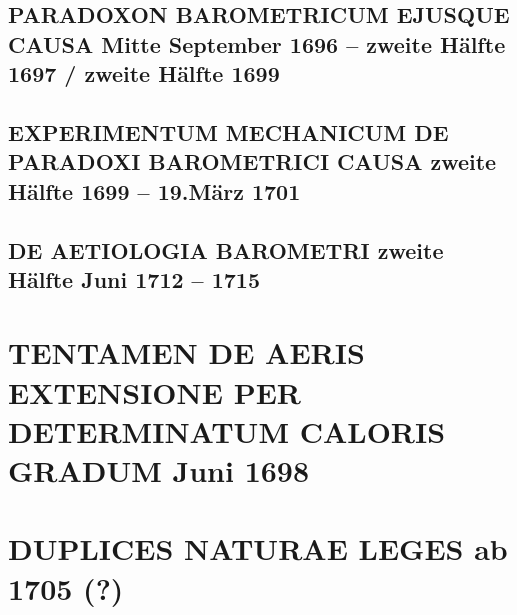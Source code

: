 \documentclass[%
fontsize=10pt,
]{scrbook}
\DeclareRobustCommand{\bracks}[1]{%
\textup{\lbrack}#1\textup{\rbrack}}
\begin{document}
\section[tocentry={Paradoxon barometricum ejusque causa
\enskip%
\bracks{%
Mitte September 1696 -- zweite Hälfte 1697 / zweite Hälfte 1699%
}%
},
head={Paradoxon barometricum ejusque causa}]%
{\MakeUppercase{Paradoxon barometricum ejusque causa}
\newline%
\bracks{%
Mitte September 1696 -- zweite Hälfte 1697 / zweite Hälfte 1699%
}}
\label{60267}



\section[tocentry={Experimentum mechanicum de paradoxi barometrici causa %
\enskip \bracks{zweite Hälfte 1699 -- 19.\;März 1701}%
},
head={Experimentum mechanicum de paradoxi barometrici causa}]%
{\MakeUppercase{Experimentum mechanicum de paradoxi barometrici causa} %
\newline \bracks{zweite Hälfte 1699 -- 19.\;März 1701}%
}
\label{36805}



\section[tocentry={De aetiologia barometri
\enskip%
\bracks{zweite Hälfte Juni 1712 --
1715%
}},
head={De aetiologia barometri}]%
{\MakeUppercase{De aetiologia barometri} %
\newline%
\bracks{zweite Hälfte Juni 1712 --
1715%
}}
\label{54958}




\chapter[tocentry={Tentamen de aeris extensione per determinatum caloris gradum
\enskip Juni 1698}, %
head={Tentamen de aeris extensione %
}]%
{\MakeUppercase{Tentamen de aeris extensione per determinatum caloris gradum}
\newline Juni 1698} %
\label{36650}




\chapter[tocentry={Duplices naturae leges %
\enskip\bracks{%
ab 1705 (?)%
}}, %
head={Duplices naturae leges%
}]%
{\MakeUppercase{Duplices naturae leges} %
\newline\bracks{%
ab 1705 (?)%
}}%
\label{39746}

\end{document}
